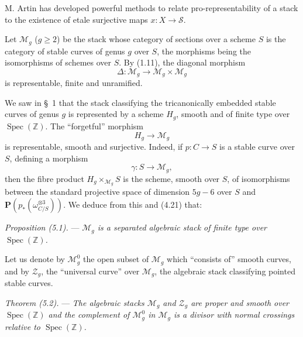 \documentclass[10pt]{article}
\newcommand{\Spec}{\operatorname{Spec}}
\newcommand{\PP}{\mathbf P}
\begin{document}
M. Artin has developed powerful methods to relate pro-representability of a stack to the existence of etale surjective maps $x:X\to\mathscr S$.

\medskip
{}

Let $\mathcal M_g$ ($g\geq 2$) be the stack whose category of sections over a scheme $S$ is the category of stable curves of genus $g$ over $S$, the morphisms being the isomorphisms of schemes over $S$. By (1.11), the diagonal morphism
\[
\Delta:\mathcal M_g\longrightarrow \mathcal M_g\times\mathcal M_g
\]
is representable, finite and unramified.

We saw in \S~1 that the stack classifying the tricanonically embedded stable curves of genus $g$ is represented by a scheme $H_g$, smooth and of finite type over $\Spec(\mathbb Z)$. The ``forgetful'' morphism
\[
H_g\longrightarrow \mathcal M_g
\]
is representable, smooth and surjective. Indeed, if $p:C\to S$ is a stable curve over $S$, defining a morphism
\[
\gamma:S\longrightarrow \mathcal M_g,
\]
then the fibre product $H_g\times_{\mathcal M_g}S$ is the scheme, smooth over $S$, of isomorphisms between the standard projective space of dimension $5g-6$ over $S$ and $\PP(p_*(\omega_{C/S}^{\otimes 3}))$. We deduce from this and (4.21) that:

\medskip
\noindent\emph{Proposition (5.1).} --- \emph{$\mathcal M_g$ is a separated algebraic stack of finite type over $\Spec(\mathbb Z)$.}

Let us denote by $\mathcal M_g^0$ the open subset of $\mathcal M_g$ which ``consists of'' smooth curves, and by $\mathcal Z_g$, the ``universal curve'' over $\mathcal M_g$, the algebraic stack classifying pointed stable curves.

\medskip
\noindent\emph{Theorem (5.2).} --- \emph{The algebraic stacks $\mathcal M_g$ and $\mathcal Z_g$ are proper and smooth over $\Spec(\mathbb Z)$ and the complement of $\mathcal M_g^0$ in $\mathcal M_g$ is a divisor with normal crossings relative to $\Spec(\mathbb Z)$.}
\end{document}
